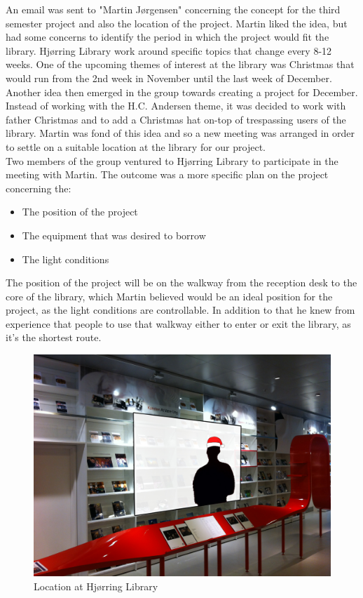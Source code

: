 An email was sent to "Martin Jørgensen" concerning the concept for the third semester project and also the location of the project. Martin liked the idea, but had some concerns to identify the period in which the project would fit the library. Hjørring Library work around specific topics that change every 8-12 weeks. One of the upcoming themes of interest at the library was Christmas that would run from the 2nd week in November until the last week of December. Another idea then emerged in the group towards creating a project for December. Instead of working with the H.C. Andersen theme, it was decided to work with father Christmas and to add a Christmas hat on-top of trespassing users of the library. Martin was fond of this idea and so a new meeting was arranged in order to settle on a suitable location at the library for our project.\\
Two members of the group ventured to Hjørring Library to participate in the meeting with Martin. The outcome was a more specific plan on the project concerning the:
\begin{itemize}
\item The position of the project
\item The equipment that was desired to borrow
\item The light conditions
\end{itemize}
The position of the project will be on the walkway from the reception desk to the core of the library, which Martin believed would be an ideal position for the project, as the light conditions are controllable. In addition to that he knew from experience that people to use that walkway either to enter or exit the library, as it's the shortest route.
\begin{figure}[htbp]
\centering
\includegraphics[width=1.00\textwidth]{Pictures/HjoerringLibrary/LocationJohannesHat.jpg}
\caption{Location at Hjørring Library}
\label{fig:Location at Hjørring Library}
\end{figure}



